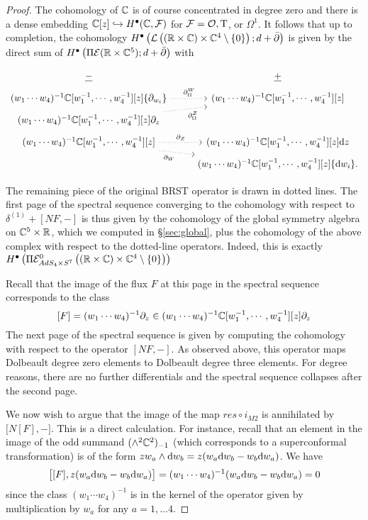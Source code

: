 \begin{proof}
The cohomology of $\mathbb{C}$ is of course concentrated in degree zero and there is a dense embedding $\mathbb{C}[z] \hookrightarrow H^\bullet(\mathbb{C}, \mathcal{F})$ for $\mathcal{F} = \mathcal{O}, {\mathrm{T}}$, or $\Omega^1$. It follows that up to completion, the cohomology $H^\bullet \left ( \mathcal{L} \left ( (\mathbb{R}\times \mathbb{C}) \times \mathbb{C}^4\setminus \{0\} \right ); d+\bar{\partial} \right )$ is given by the direct sum of $H^\bullet \left ( \Pi \mathcal{E}  (\mathbb{R}\times \mathbb{C}^5 ); d+\bar{\partial} \right )$ with

\begin{equation}
  \label{eqn:ads4ss2} 
   \begin{tikzcd}[row sep = 1 ex]
    \ul{-} & \ul{+} \\
(w_1\cdots w_4)^{-1}\C[w_1^{-1},\cdots, w_4^{-1}][z] \{\partial_{w_i}\}  \ar[r, dotted, "\div^W"] & (w_1\cdots w_4)^{-1}\C[w_1^{-1},\cdots, w_4^{-1}] [z] \\
(w_1\cdots w_4)^{-1}\C[w_1^{-1},\cdots, w_4^{-1}] [z] \partial_z \ar[ur, dotted, "\div^Z"'] \\
(w_1\cdots w_4)^{-1}\C[w_1^{-1},\cdots, w_4^{-1}] [z] \ar[r, dotted, "\del_Z"] \ar[dr, dotted, "\del_W"'] & (w_1\cdots w_4)^{-1}\C[w_1^{-1},\cdots, w_4^{-1}][z] \d z \\ & (w_1\cdots w_4)^{-1}\C[w_1^{-1},\cdots, w_4^{-1}][z] \{\d w_i\} .
\end{tikzcd}
\end{equation}

The remaining piece of the original BRST operator is drawn in dotted lines. 
The first page of the spectral sequence converging to the cohomology with respect to $\delta^{(1)} + [N F, -]$ is thus given by the cohomology of the global symmetry algebra on $\mathbb{C}^5 \times \mathbb{R}$, which we computed in \S \ref{sec:global}, plus the cohomology of the above complex with respect to the dotted-line operators. Indeed, this is exactly $H^\bullet \left ( \Pi \mathcal{E}^0_{AdS_4\times S^7} \left ( (\mathbb{R}\times \mathbb{C}) \times \mathbb{C}^4\setminus \{0\} \right ) \right )$

Recall that the image of the flux $F$ at this page in the spectral sequence corresponds to the class 
\[
[F] = (w_1 \cdots w_4)^{-1} \partial_z \in (w_1\cdots w_4)^{-1}\mathbb{C}[w_1^{-1},\cdots, w_4^{-1}] [z] \partial_z
\]
The next page of the spectral sequence is given by computing the cohomology with respect to the operator $[N F,-]$. 
As observed above, this operator maps Dolbeault degree zero elements to Dolbeault degree three elements. 
For degree reasons, there are no further differentials and the spectral sequence collapses after the second page. 

We now wish to argue that the image of the map $res\circ i_{M2}$ is annihilated by $\big[ N [F] , - \big]$. This is a direct calculation. For instance, recall that an element in the image of the odd summand $(\wedge^2 \mathbb{C}^2)_{-1}$ (which corresponds to a superconformal transformation) is of the form $z w_a \wedge \mathrm{d} w_b = z(w_a \mathrm{d} w_b - w_b \mathrm{d} w_a)$. 
We have
\[
\big[[F] , z(w_a \mathrm{d} w_b - w_b \mathrm{d} w_a) \big] = (w_1\cdots w_4)^{-1} (w_a \mathrm{d} w_b - w_b \mathrm{d} w_a) = 0
\]
since the class $(w_1\cdots w_4)^{-1}$ is in the kernel of the operator given by multiplication by $w_a$ for any $a = 1,\ldots 4$. 
\end{proof}


